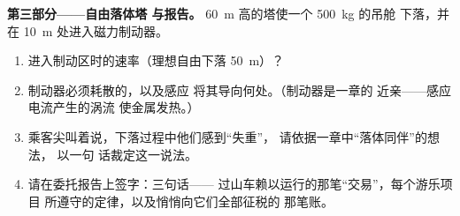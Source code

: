 \begin{problem}
\medskip\noindent\textbf{第三部分——自由落体塔
与报告。}
\qty{60}{m} 高的塔使一个 \qty{500}{kg} 的吊舱
下落，并在 \qty{10}{m} 处进入磁力制动器。
\begin{enumerate}[resume]
  \item 进入制动区时的速率（理想自由下落
        \qty{50}{m}）？
  \item 制动器必须耗散的，以及感应
        将其导向何处。（制动器是一章的
        近亲——感应电流产生的涡流
        使金属发热。）
  \item 乘客尖叫着说，下落过程中他们感到“失重”，
        请依据一章中“落体同伴”的想法，
        以一句
        话裁定这一说法。
  \item 请在委托报告上签字：三句话——
        过山车赖以运行的那笔“交易”，每个游乐项目
        所遵守的定律，以及悄悄向它们全部征税的
        那笔账。
\end{enumerate}
\end{problem}

